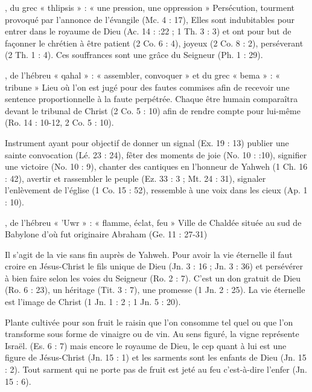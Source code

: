 \begin{multicols}{2}
, du grec « thlipsis » : « une pression, une oppression »
Persécution, tourment provoqué par l'annonce de l'évangile (Mc. 4 : 17), Elles sont indubitables pour entrer dans le royaume de Dieu (Ac. 14 : :22 ; 1 Th. 3 : 3) et ont pour but de façonner le chrétien à être patient (2 Co. 6 : 4), joyeux (2 Co. 8 : 2), perséverant (2 Th. 1 : 4). Ces souffrances sont une grâce du Seigneur (Ph. 1 : 29).


, de l'hébreu « qahal » : « assembler, convoquer » et du grec « bema » : « tribune »
Lieu où l'on est jugé pour des fautes commises afin de recevoir une sentence proportionnelle à la faute perpétrée. Chaque être humain comparaîtra devant le tribunal de Christ (2 Co. 5 : 10) afin de rendre compte pour lui-même (Ro. 14 : 10-12, 2 Co. 5 : 10).


Instrument ayant pour objectif de donner un signal (Ex. 19 : 13) publier une sainte convocation (Lé. 23 : 24), fêter des moments de joie (No. 10 : :10), signifier une victoire (No. 10 : 9), chanter des cantiques en l'honneur de Yahweh (1 Ch. 16 : 42), avertir et rassembler le peuple (Ez. 33 : 3 ; Mt. 24 : 31), signaler l'enlèvement de l'église (1 Co. 15 : 52), ressemble à une voix dans les cieux (Ap. 1 : 10).


, de l'hébreu « 'Uwr » : « flamme, éclat, feu »
Ville de Chaldée située au sud de Babylone d'où fut originaire Abraham (Ge. 11 : 27-31)


Il s'agit de la vie sans fin auprès de Yahweh. Pour avoir la vie éternelle il faut croire en Jésus-Christ le fils unique de Dieu (Jn. 3 : 16 ; Jn. 3 : 36) et persévérer à bien faire selon les voies du Seigneur (Ro. 2 : 7). C'est un don gratuit de Dieu (Ro. 6 : 23), un héritage (Tit. 3 : 7), une promesse (1 Jn. 2 : 25). La vie éternelle est l'image de Christ (1 Jn. 1 : 2 ; 1 Jn. 5 : 20).


Plante cultivée pour son fruit le raisin que l'on consomme tel quel ou que l'on transforme sous forme de vinaigre ou de vin. Au sens figuré, la vigne représente Israël. (Es. 6 : 7) mais encore le royaume de Dieu, le cep quant à lui est une figure de Jésus-Christ (Jn. 15 : 1) et les sarments sont les enfants de Dieu (Jn. 15 : 2). Tout sarment qui ne porte pas de fruit est jeté au feu c'est-à-dire l'enfer (Jn. 15 : 6).



\end{multicols}

